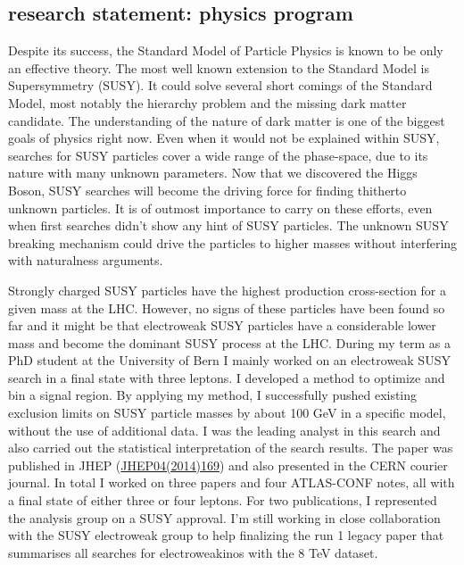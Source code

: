 \documentclass[]{cv} %
\begin{document}
\begin{statement}

\section{research statement: physics program}

Despite its success, the Standard Model of Particle Physics is known to be only
an effective theory. The most well known extension to the Standard Model is
Supersymmetry (SUSY). It could solve several short comings of the Standard
Model, most notably the hierarchy problem and the missing dark matter candidate.
The understanding of the nature of dark matter is one of the biggest goals of
physics right now. Even when it would not be explained within SUSY, searches for
SUSY particles cover a wide range of the phase-space, due to its nature with
many unknown parameters. Now that we discovered the Higgs Boson, SUSY searches
will become the driving force for finding thitherto unknown particles. It is of
outmost importance to carry on these efforts, even when first searches didn't
show any hint of SUSY particles. The unknown SUSY breaking mechanism could drive
the particles to higher masses without interfering with naturalness arguments.

Strongly charged SUSY particles have the highest production cross-section for a
given mass at the LHC. However, no signs of these particles have been found so
far and it might be that electroweak SUSY particles have a considerable lower
mass and become the dominant SUSY process at the LHC. During my term as a PhD
student at the University of Bern I mainly worked on an electroweak SUSY search
in a final state with three leptons. I developed a method to optimize and bin a
signal region. By applying my method, I successfully pushed existing exclusion
limits on SUSY particle masses by about 100 GeV in a specific model, without the
use of additional data. I was the leading analyst in this search and also
carried out the statistical interpretation of the search results. The paper was
published in JHEP
(\href{http://dx.doi.org/10.1007/JHEP04(2014)169}{JHEP04(2014)169}) and also
presented in the CERN courier journal. In total I worked on three papers and
four ATLAS-CONF notes, all with a final state of either three or four leptons.
For two publications, I represented the analysis group on a SUSY approval. I'm
still working in close collaboration with the SUSY electroweak group to help
finalizing the run 1 legacy paper that summarises all searches for
electroweakinos with the 8 TeV dataset.


\end{statement}
\end{document}
